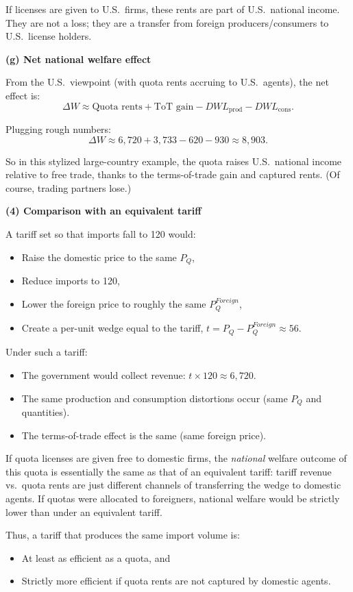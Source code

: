 \documentclass[12pt]{article}
\begin{document}
If licenses are given to U.S.\ firms, these rents are part of U.S.\ national income. They are not a loss; they are a transfer from foreign producers/consumers to U.S.\ license holders.

\textbf{(g) Net national welfare effect}

From the U.S.\ viewpoint (with quota rents accruing to U.S.\ agents), the net effect is:
\[
\Delta W \approx \text{Quota rents} + \text{ToT gain} - DWL_{\text{prod}} - DWL_{\text{cons}}.
\]

Plugging rough numbers:
\[
\Delta W \approx 6{,}720 + 3{,}733 - 620 - 930 \approx 8{,}903.
\]

So in this stylized large-country example, the quota raises U.S.\ national income relative to free trade, thanks to the terms-of-trade gain and captured rents. (Of course, trading partners lose.)

\textbf{(4) Comparison with an equivalent tariff}

A tariff set so that imports fall to 120 would:
\begin{itemize}
\item Raise the domestic price to the same $P_Q$,
\item Reduce imports to 120,
\item Lower the foreign price to roughly the same $P^{Foreign}_Q$,
\item Create a per-unit wedge equal to the tariff, $t = P_Q - P^{Foreign}_Q \approx 56$.
\end{itemize}

Under such a tariff:
\begin{itemize}
\item The government would collect revenue: $t \times 120 \approx 6{,}720$.
\item The same production and consumption distortions occur (same $P_Q$ and quantities).
\item The terms-of-trade effect is the same (same foreign price).
\end{itemize}

If quota licenses are given free to domestic firms, the \emph{national} welfare outcome of this quota is essentially the same as that of an equivalent tariff: tariff revenue vs.\ quota rents are just different channels of transferring the wedge to domestic agents. If quotas were allocated to foreigners, national welfare would be strictly lower than under an equivalent tariff.

Thus, a tariff that produces the same import volume is:
\begin{itemize}
\item At least as efficient as a quota, and
\item Strictly more efficient if quota rents are not captured by domestic agents.
\end{itemize}
\end{document}
